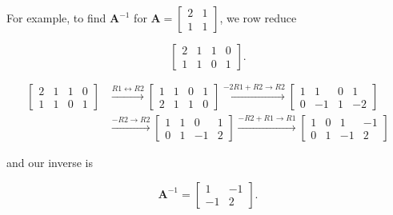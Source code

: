 \documentclass[
]{book}
\theoremstyle{definition}
\theoremstyle{definition}
\theoremstyle{definition}
\theoremstyle{definition}
\theoremstyle{remark}
\begin{document}
For example, to find \(\mathbf{A}^{-1}\) for \(\mathbf{A}=\displaystyle{\begin{bmatrix}
2 & 1\\1 & 1
\end{bmatrix}}\), we row reduce

\[\left[\begin{array}{cc|cc}
2 & 1 & 1 & 0\\1 & 1 & 0 & 1
\end{array}\right].\]

\begin{align*}\left[\begin{array}{cc|cc}
2 & 1 & 1 & 0\\1 & 1 & 0 & 1
\end{array}\right]&\xrightarrow{R1\leftrightarrow R2}\left[\begin{array}{cc|cc}
1 & 1 & 0 & 1\\2 & 1 & 1 & 0
\end{array}\right] \xrightarrow{-2R1+R2\to R2} \left[\begin{array}{cc|cc}
     1& 1 & 0 & 1  \\
     0 & -1 & 1 & -2
\end{array}\right] \\
&\xrightarrow{-R2\to R2} \left[\begin{array}{cc|cc}
     1& 1 & 0 & 1  \\
     0 & 1 & -1 & 2
\end{array}\right] \xrightarrow{-R2+R1\to R1} 
\left[\begin{array}{rr|rr}
     1& 0 & 1 & -1  \\
     0 & 1 & -1 & 2
\end{array}\right]
\end{align*}

and our inverse is

\[\mathbf{A}^{-1}=\begin{bmatrix}
1 & -1\\-1 & 2
\end{bmatrix}.\]
\end{document}
